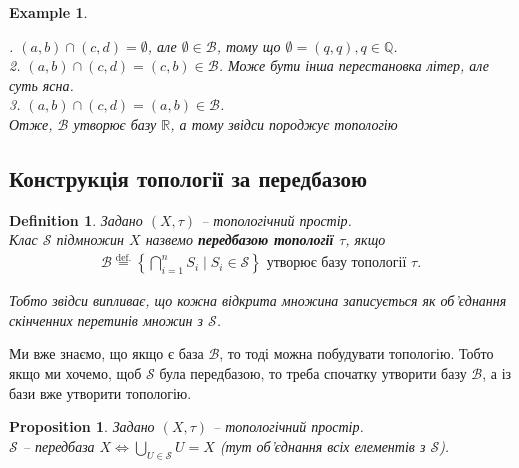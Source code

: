 \documentclass[a4paper, 10pt]{article}
\theoremstyle{theoremdd}
\newtheorem{definition}[theorem]{Definition}
\newtheorem{example}[theorem]{Example}
\newtheorem{proposition}[theorem]{Proposition}
\begin{document}
\begin{example}
\begin{figure}[H]
\end{figure}
. $(a,b) \cap (c,d) = \emptyset$, але $\emptyset \in \mathcal{B}$, тому що $\emptyset = (q,q), q \in \mathbb{Q}$.\\
2. $(a,b) \cap (c,d) = (c,b) \in \mathcal{B}$. Може бути інша перестановка літер, але суть ясна.\\
3. $(a,b) \cap (c,d) = (a,b) \in \mathcal{B}$.\\
Отже, $\mathcal{B}$ утворює базу $\mathbb{R}$, а тому звідси породжує топологію
\fi
\end{example}

\subsection{Конструкція топології за передбазою}
\begin{definition}
Задано $(X,\tau)$ -- топологічний простір.\\
Клас $\mathcal{S}$ підмножин $X$ назвемо \textbf{передбазою топології $\tau$}, якщо
\begin{align*}
\mathcal{B} \overset{\text{def.}}{=} \left\{ \bigcap_{i=1}^n S_i \mid S_i \in \mathcal{S} \right\} \text{ утворює базу топології } \tau.
\end{align*}
\iffalse
Тобто з цього випливає, що
\begin{align*}
\forall U \in \tau: U = \displaystyle\bigcup_{\bigcap_{i=1}^n S_i \in \mathcal{\tilde{B}}} \bigcap_{i=1}^n S_i, \text{ де } \mathcal{\tilde{B}} \subset \mathcal{B}
\end{align*}
\fi
Тобто звідси випливає, що кожна відкрита множина записується як об'єднання скінченних перетинів множин з $\mathcal{S}$.
\end{definition}

\noindent Ми вже знаємо, що якщо є база $\mathcal{B}$, то тоді можна побудувати топологію. Тобто якщо ми хочемо, щоб $\mathcal{S}$ була передбазою, то треба спочатку утворити базу $\mathcal{B}$, а із бази вже утворити топологію.

\begin{proposition}
Задано $(X,\tau)$ -- топологічний простір.\\
$\mathcal{S}$ -- передбаза $X \iff \displaystyle\bigcup_{U \in \mathcal{S}} U = X$ (тут об'єднання всіх елементів з $\mathcal{S}$).
\end{proposition}
\end{document}
